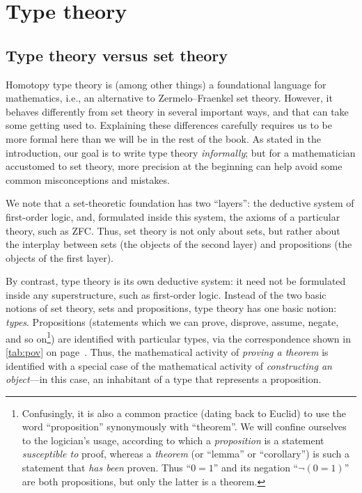 \chapter{Type theory}
\label{cha:typetheory}

\section{Type theory versus set theory}
\label{sec:types-vs-sets}
\label{sec:axioms}

Homotopy type theory is (among other things) a foundational language for mathematics, i.e., an alternative to Zermelo--Fraenkel set theory.
However, it behaves differently from set theory in several important ways, and that can take some getting used to.
Explaining these differences carefully requires us to be more formal here than we will be in the rest of the book.
As stated in the introduction, our goal is to write type theory \emph{informally}; but for a mathematician accustomed to set theory, more precision at the beginning can help avoid some common misconceptions and mistakes.

We note that a set-theoretic foundation has two ``layers'': the deductive system of first-order logic, and, formulated inside this system, the axioms of a particular theory, such as ZFC.
Thus, set theory is not only about sets, but rather about the interplay between sets (the objects of the second layer) and propositions (the objects of the first layer).

By contrast, type theory is its own deductive system: it need not be formulated inside any superstructure, such as first-order logic.
Instead of the two basic notions of set theory, sets and propositions, type theory has one basic notion: \emph{types}.
Propositions (statements which we can prove, disprove, assume, negate, and so on\footnote{Confusingly, it is also a common practice (dating 
back to Euclid) to use the word ``proposition'' synonymously with ``theorem''.
  We will confine ourselves to the logician's usage, according to which a \emph{proposition} is a statement \emph{susceptible to} proof, whereas a \emph{theorem} (or ``lemma'' or ``corollary'') is such a statement that \emph{has been} proven.
Thus ``$0=1$'' and its negation ``$\neg(0=1)$'' are both propositions, but only the latter is a theorem.}) are identified with particular types, via the correspondence shown in \autoref{tab:pov} on page~\pageref{tab:pov}.
Thus, the mathematical activity of \emph{proving a theorem} is identified with a special case of the mathematical activity of \emph{constructing an object}---in this case, an inhabitant of a type that represents a proposition.

